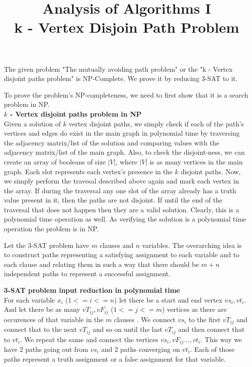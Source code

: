 \documentclass{imports}
\title{\textbf{Analysis of Algorithms I}\\ k - Vertex Disjoin Path Problem}
\author{}
\date{}
\begin{document}
\maketitle
\allowdisplaybreaks %

    The given problem "The mutually avoiding path problem" or the "k - Vertex disjoint paths problem" is NP-Complete.
    We prove it by reducing 3-SAT to it. \cite{kddmain} \cite{stackoverflowkdd} \vspace{10pt}
    
    To prove the problem's NP-completeness, we need to first show that it is a search problem in NP.\\
    
    \textbf{$k$ - Vertex disjoint paths problem in NP}\\

    Given a solution of $k$ vertex disjoint paths, we simply check if each of the path's vertices and edges do exist in the main graph
    in polynomial time by traversing the adjacency matrix/list of the solution and comparing values with the adjacency matrix/list of the main graph.
    Also, to check the disjoint-ness, we can create an array of booleans of size $|V|$, where $|V|$ is as many vertices in the main graph. Each slot represents each vertex's presence
    in the $k$ disjoint paths. Now, we simply perform the travesal described above again and mark each vertex in the array. If during the traversal
    any one slot of the array already has a truth value present in it, then the paths are not disjoint. If until the end of the traversal that does not
    happen then they are a valid solution. Clearly, this is a polynomial time operation as well. As verifying the solution is a polynomial time
    operation the problem is in NP. \vspace{10pt}

    Let the 3-SAT problem have $m$ clauses and $n$ variables. The overarching idea is to construct paths representing
    a satisfying assignment to each variable and to each clause and relating them in such a way that there should be $m+n$
    independent paths to represent a successful assignment. \vspace{10pt}

    \textbf{3-SAT problem input reduction in polynomial time}\\
    
    For each variable $x_i$ ($1<=i<=n$) let there be a start and end vertex $vs_i, vt_i$. And let there be as many $vT_{ij}, vF_{ij}$
    ($1<=j<=m$) vertices as there are occurences of that variable in the $m$ clauses . We connect $vs_i$ to the first $vT_{ij}$ and connect
    that to the next $vT_{ij}$ and so on until the last $vT_{ij}$ and then connect that to $vt_i$. We repeat the same and connect the vertices $vs_i, vF_{ij}..., vt_i$. This way we have 2 paths going out from $vs_i$ and 2 paths converging on $vt_i$. Each of those paths represent a truth assignment
    or a false assignment for that variable. \vspace{10pt}
\end{document}
